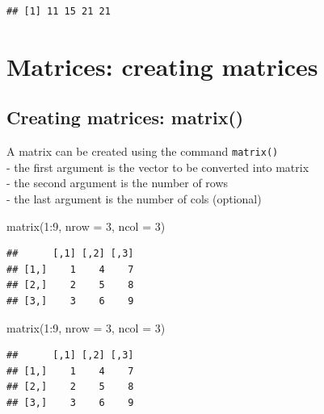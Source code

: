 \documentclass[
  11pt,
]{book}
\newenvironment{Shaded}{\begin{snugshade}}{\end{snugshade}}
\newcommand{\AttributeTok}[1]{\textcolor[rgb]{0.77,0.63,0.00}{#1}}
\newcommand{\DecValTok}[1]{\textcolor[rgb]{0.00,0.00,0.81}{#1}}
\newcommand{\FunctionTok}[1]{\textcolor[rgb]{0.00,0.00,0.00}{#1}}
\newcommand{\NormalTok}[1]{#1}
\newcommand{\SpecialCharTok}[1]{\textcolor[rgb]{0.00,0.00,0.00}{#1}}
\begin{document}
\begin{verbatim}
## [1] 11 15 21 21
\end{verbatim}

\hypertarget{matrices-creating-matrices}{%
\section{Matrices: creating matrices}\label{matrices-creating-matrices}}

\hypertarget{creating-matrices-matrix}{%
\subsection{Creating matrices: matrix()}\label{creating-matrices-matrix}}

A matrix can be created using the command \texttt{matrix()}\\
- the first argument is the vector to be converted into matrix\\
- the second argument is the number of rows\\
- the last argument is the number of cols (optional)

\begin{Shaded}
\begin{Highlighting}[]
\FunctionTok{matrix}\NormalTok{(}\DecValTok{1}\SpecialCharTok{:}\DecValTok{9}\NormalTok{, }\AttributeTok{nrow =} \DecValTok{3}\NormalTok{, }\AttributeTok{ncol =} \DecValTok{3}\NormalTok{)}
\end{Highlighting}
\end{Shaded}

\begin{verbatim}
##      [,1] [,2] [,3]
## [1,]    1    4    7
## [2,]    2    5    8
## [3,]    3    6    9
\end{verbatim}

\begin{Shaded}
\begin{Highlighting}[]
\FunctionTok{matrix}\NormalTok{(}\DecValTok{1}\SpecialCharTok{:}\DecValTok{9}\NormalTok{, }\AttributeTok{nrow =} \DecValTok{3}\NormalTok{, }\AttributeTok{ncol =} \DecValTok{3}\NormalTok{)}
\end{Highlighting}
\end{Shaded}

\begin{verbatim}
##      [,1] [,2] [,3]
## [1,]    1    4    7
## [2,]    2    5    8
## [3,]    3    6    9
\end{verbatim}
\end{document}
